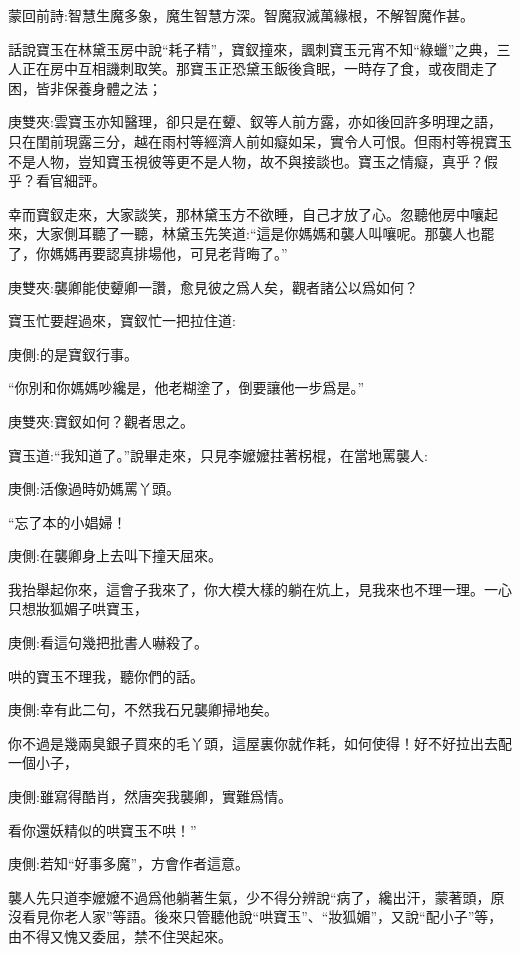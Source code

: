 
\begin{parag}
    \begin{note}蒙回前詩:智慧生魔多象，魔生智慧方深。智魔寂滅萬緣根，不解智魔作甚。\end{note}
\end{parag}


\begin{parag}
    話說寶玉在林黛玉房中說“耗子精”，寶釵撞來，諷刺寶玉元宵不知“綠蠟”之典，三人正在房中互相譏刺取笑。那寶玉正恐黛玉飯後貪眠，一時存了食，或夜間走了困，皆非保養身體之法；\begin{note}庚雙夾:雲寶玉亦知醫理，卻只是在顰、釵等人前方露，亦如後回許多明理之語，只在閨前現露三分，越在雨村等經濟人前如癡如呆，實令人可恨。但雨村等視寶玉不是人物，豈知寶玉視彼等更不是人物，故不與接談也。寶玉之情癡，真乎？假乎？看官細評。\end{note}幸而寶釵走來，大家談笑，那林黛玉方不欲睡，自己才放了心。忽聽他房中嚷起來，大家側耳聽了一聽，林黛玉先笑道:“這是你媽媽和襲人叫嚷呢。那襲人也罷了，你媽媽再要認真排場他，可見老背晦了。”\begin{note}庚雙夾:襲卿能使顰卿一讚，愈見彼之爲人矣，觀者諸公以爲如何？\end{note}
\end{parag}


\begin{parag}
    寶玉忙要趕過來，寶釵忙一把拉住道:\begin{note}庚側:的是寶釵行事。\end{note}“你別和你媽媽吵纔是，他老糊塗了，倒要讓他一步爲是。”\begin{note}庚雙夾:寶釵如何？觀者思之。\end{note}寶玉道:“我知道了。”說畢走來，只見李嬤嬤拄著柺棍，在當地罵襲人:\begin{note}庚側:活像過時奶媽罵丫頭。\end{note}“忘了本的小娼婦！\begin{note}庚側:在襲卿身上去叫下撞天屈來。\end{note}我抬舉起你來，這會子我來了，你大模大樣的躺在炕上，見我來也不理一理。一心只想妝狐媚子哄寶玉，\begin{note}庚側:看這句幾把批書人嚇殺了。\end{note}哄的寶玉不理我，聽你們的話。\begin{note}庚側:幸有此二句，不然我石兄襲卿掃地矣。\end{note}你不過是幾兩臭銀子買來的毛丫頭，這屋裏你就作耗，如何使得！好不好拉出去配一個小子，\begin{note}庚側:雖寫得酷肖，然唐突我襲卿，實難爲情。\end{note}看你還妖精似的哄寶玉不哄！”\begin{note}庚側:若知“好事多魔”，方會作者這意。\end{note}襲人先只道李嬤嬤不過爲他躺著生氣，少不得分辨說“病了，纔出汗，蒙著頭，原沒看見你老人家”等語。後來只管聽他說“哄寶玉”、“妝狐媚”，又說“配小子”等，由不得又愧又委屈，禁不住哭起來。
\end{parag}


